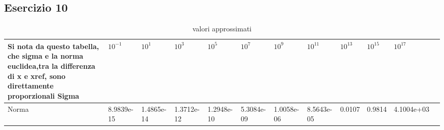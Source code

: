 \subsection{Esercizio 10}

\begin{table}[h]
\begin{tabular}{|l l l l l l l l l l l l|}
Si nota da questo tabella, che sigma e la norma euclidea,tra la differenza di x e xref, sono  direttamente  proporzionali
        \hline
        Sigma &$10^{-1}$ & $10^{1}$&$10^{3}$&$10^{5}$&$10^{7}$&$10^{9}$&$10^{11}$&$10^{13}$&$10^{15}$&$10^{17}$\\
        \hline
        Norma &8.9839e-15&1.4865e-14&1.3712e-12&1.2948e-10&5.3084e-09&1.0058e-06&8.5643e-05&0.0107&0.9814&   4.1004e+03\\
        
        \hline
\end{tabular}
\caption{valori approssimati}
\label{tab::1}     
\end{table}
